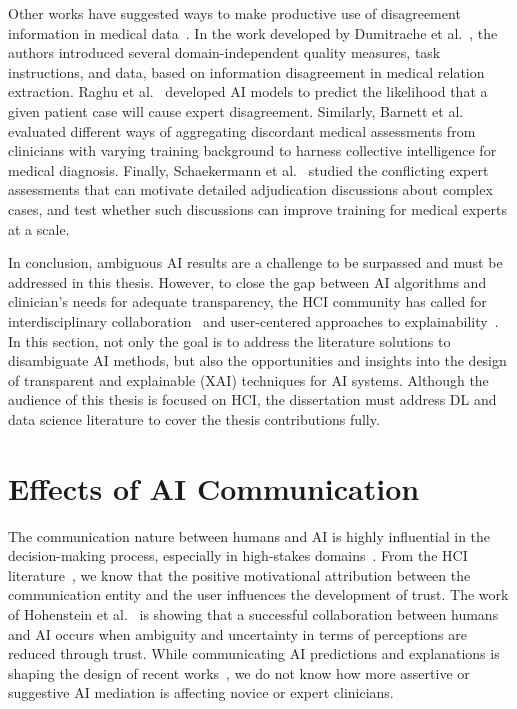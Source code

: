 Other works have suggested ways to make productive use of disagreement information in medical data~\cite{10.1001/jamanetworkopen.2019.0096, pmlr-v97-raghu19a, 10.1145/3313831.3376506}.
In the work developed by Dumitrache et al.~\cite{10.1145/3152889}, the authors introduced several domain-independent quality measures, task instructions, and data, based on information disagreement in medical relation extraction.
Raghu et al.~\cite{pmlr-v97-raghu19a} developed \ac{AI} models to predict the likelihood that a given patient case will cause expert disagreement.
Similarly, Barnett et al.~\cite{10.1001/jamanetworkopen.2019.0096} evaluated different ways of aggregating discordant medical assessments from clinicians with varying training background to harness collective intelligence for medical diagnosis.
Finally, Schaekermann et al.~\cite{10.1145/3313831.3376506, SchaekermannMike2020} studied the conflicting expert assessments that can motivate detailed adjudication discussions about complex cases, and test whether such discussions can improve training for medical experts at a scale.

In conclusion, ambiguous \ac{AI} results are a challenge to be surpassed and must be addressed in this thesis.
However, to close the gap between \ac{AI} algorithms and clinician's needs for adequate transparency, the \ac{HCI} community has called for interdisciplinary collaboration~\cite{10.1145/3173574.3174156, Tschandl2020} and user-centered approaches to explainability~\cite{10.1145/3290605.3300831, 10.1145/3313831.3376590}.
In this section, not only the goal is to address the literature solutions to disambiguate \ac{AI} methods, but also the opportunities and insights into the design of transparent and explainable (\acs{XAI}) techniques for \ac{AI} systems.
Although the audience of this thesis is focused on \ac{HCI}, the dissertation must address \ac{DL} and data science literature to cover the thesis contributions fully.

\section{Effects of AI Communication}
\label{sec:chap003008}

The communication nature between humans and \ac{AI} is highly influential in the decision-making process, especially in high-stakes domains~\cite{10.1145/3544548.3580682}.
From the \ac{HCI} literature~\cite{10.1145/3479587}, we know that the positive motivational attribution between the communication entity and the user influences the development of trust.
The work of Hohenstein et al.~\cite{HOHENSTEIN2020106190} is showing that a successful collaboration between humans and \ac{AI} occurs when ambiguity and uncertainty in terms of perceptions are reduced through trust.
While communicating \ac{AI} predictions and explanations is shaping the design of recent works~\cite{CALISTO2021102607}, we do not know how more assertive or suggestive \ac{AI} mediation is affecting novice or expert clinicians.

